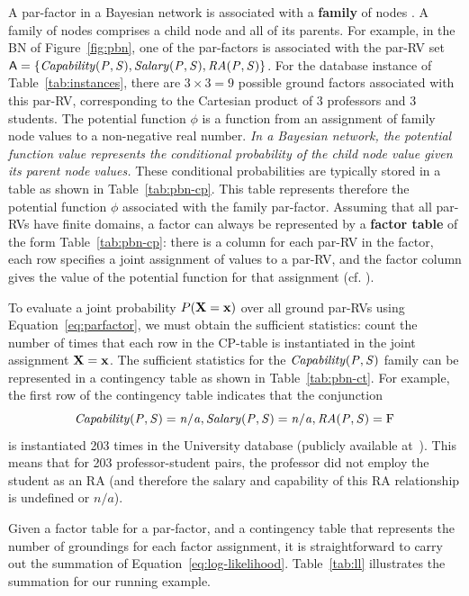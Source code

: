 A par-factor in a Bayesian network is associated with a \textbf{family} of nodes \cite[Sec.2.2.1]{Kimmig2015}. A family of nodes comprises a child node and all of its parents. For example, in the BN of Figure~\ref{fig:pbn}, one of the par-factors is associated with the par-RV set $\parrvs=\{\it{Capability}(\P,\S),\it{Salary}(\P,\S),\it{RA}(\P,\S)\}$. For the database instance of  Table~\ref{tab:instances}, there are $3\times3=9$ possible ground factors associated with this par-RV, corresponding to the Cartesian product of 3 professors and 3 students. The potential function $\phi$ is a function from an assignment of family node values to a non-negative real number. {\em In a Bayesian network, the potential function value represents the conditional probability of the child node value given its parent node values.} These conditional probabilities are typically stored in a table as shown in Table~\ref{tab:pbn-cp}. This table represents therefore the potential function $\phi$ associated with the family par-factor. Assuming that all par-RVs have finite domains, a factor can always be represented by a \textbf{factor table} of the form Table~\ref{tab:pbn-cp}: there is a column for each par-RV in the factor, each row specifies a joint assignment of values to a par-RV, and the factor column gives the value of the potential function for that assignment (cf. \cite[Sec.2.2.1]{Kimmig2015}).


To evaluate a joint probability $P(\set{X}=\set{x})$ over all ground par-RVs using Equation~\ref{eq:parfactor}, we must obtain the sufficient statistics: count the number of times that each row in the CP-table is instantiated in the joint assignment $\set{X}=\set{x}$. 
The sufficient statistics for the $\it{Capability}(\P,\S)$ family can be represented in a contingency table as shown in Table~\ref{tab:pbn-ct}. For example, the first row of the contingency table indicates that the conjunction $$\it{Capability}(\P,\S)=n/a,\it{Salary}(\P,\S)=n/a,\it{RA}(\P,\S) =\false$$ is instantiated 203 times in the University database (publicly available at~\cite{bib:bbsite}). This means that for 203 professor-student pairs, the professor did not employ the student as an RA (and therefore the salary and capability of this RA relationship is undefined or $n/a$).

Given a factor table for a par-factor, and a contingency table that represents the number of groundings for each factor assignment, it is straightforward to carry out the summation of Equation~\ref{eq:log-likelihood}. Table~\ref{tab:ll} illustrates the summation for our running example.

